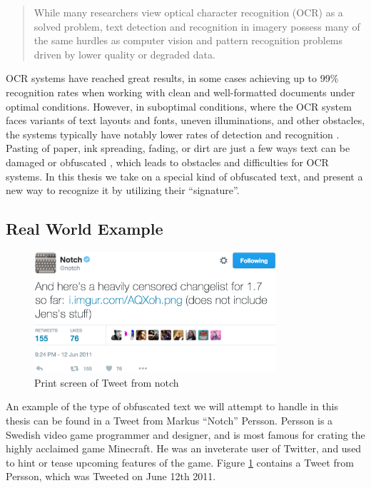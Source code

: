 \begin{quote}
    While many researchers view optical character recognition (OCR) as a solved problem, text detection and recognition in imagery possess many of the same hurdles as computer vision and pattern recognition problems driven by lower quality or degraded data.
\end{quote}

OCR systems have reached great results, in some cases achieving up to 99\% recognition rates when working with clean and well-formatted documents under optimal conditions. However, in suboptimal conditions, where the OCR system faces variants of text layouts and fonts, uneven illuminations, and other obstacles, the systems typically have notably lower rates of detection and recognition \citep{ye2015text}. Pasting of paper, ink spreading, fading, or dirt are just a few ways text can be damaged or obfuscated \citep{bhardwaj2014imaging}, which leads to obstacles and difficulties for OCR systems. In this thesis we take on a special kind of obfuscated text, and present a new way to recognize it by utilizing their ``signature''.

\subsection{Real World Example}
\begin{figure}[ht]
    \centering
    \includegraphics[width=0.8\textwidth]{fig/chapter1/notch_tweet.jpg}
    \caption{Print screen of Tweet from notch}
    \label{ref:notch_twitter}
\end{figure}

An example of the type of obfuscated text we will attempt to handle in this thesis can be found in a Tweet from Markus ``Notch'' Persson. Persson is a Swedish video game programmer and designer, and is most famous for crating the highly acclaimed game Minecraft. He was an inveterate user of Twitter, and used to hint or tease upcoming features of the game. Figure \ref{ref:notch_twitter} contains a Tweet from Persson, which was Tweeted on June 12th 2011.

